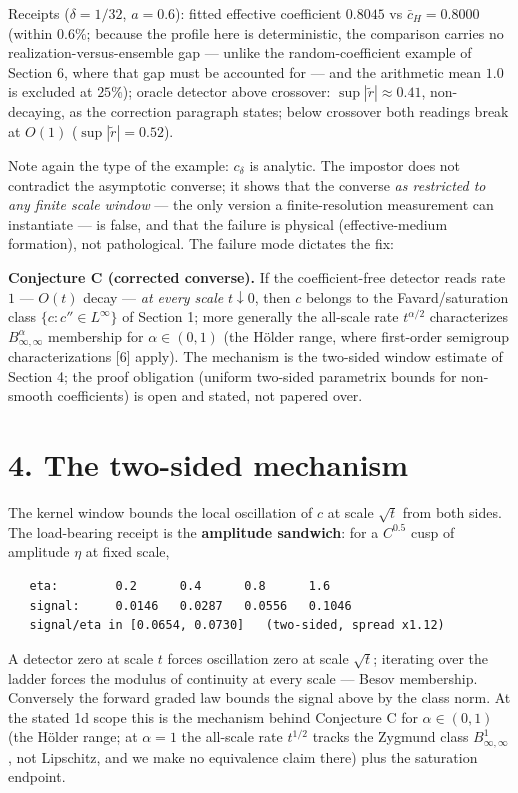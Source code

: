 \documentclass[11pt]{article}
\begin{document}
Receipts ($\delta = 1/32$, $a = 0.6$): fitted effective coefficient $0.8045$ vs $\bar c_H = 0.8000$ (within $0.6\%$; because the profile here is deterministic, the comparison carries no realization-versus-ensemble gap — unlike the random-coefficient example of Section 6, where that gap must be accounted for — and the arithmetic mean $1.0$ is excluded at $25\%$); oracle detector above crossover: $\sup|\tilde r| \approx 0.41$, non-decaying, as the correction paragraph states; below crossover both readings break at $O(1)$ ($\sup|\tilde r| = 0.52$).

Note again the type of the example: $c_\delta$ is analytic.  The impostor does not contradict the asymptotic converse; it shows that the converse \emph{as restricted to any finite scale window} — the only version a finite-resolution measurement can instantiate — is false, and that the failure is physical (effective-medium formation), not pathological.  The failure mode dictates the fix:

\textbf{Conjecture C (corrected converse).}  If the coefficient-free detector reads rate $1$ — $O(t)$ decay — \emph{at every scale} $t \downarrow 0$, then $c$ belongs to the Favard/saturation class $\{c : c'' \in L^\infty\}$ of Section 1; more generally the all-scale rate $t^{\alpha/2}$ characterizes $B^\alpha_{\infty,\infty}$ membership for $\alpha \in (0,1)$ (the Hölder range, where first-order semigroup characterizations [6] apply).  The mechanism is the two-sided window estimate of Section 4; the proof obligation (uniform two-sided parametrix bounds for non-smooth coefficients) is open and stated, not papered over.

\section*{4. The two-sided mechanism}
The kernel window bounds the local oscillation of $c$ at scale $\sqrt t$ from both sides.  The load-bearing receipt is the \textbf{amplitude sandwich}: for a $C^{0.5}$ cusp of amplitude $\eta$ at fixed scale,

\begin{small}\begin{verbatim}
   eta:        0.2      0.4      0.8      1.6
   signal:     0.0146   0.0287   0.0556   0.1046
   signal/eta in [0.0654, 0.0730]   (two-sided, spread x1.12)
\end{verbatim}\end{small}
A detector zero at scale $t$ forces oscillation zero at scale $\sqrt t$; iterating over the ladder forces the modulus of continuity at every scale — Besov membership.  Conversely the forward graded law bounds the signal above by the class norm.  At the stated 1d scope this is the mechanism behind Conjecture C for $\alpha \in (0, 1)$ (the Hölder range; at $\alpha = 1$ the all-scale rate $t^{1/2}$ tracks the Zygmund class $B^1_{\infty,\infty}$, not Lipschitz, and we make no equivalence claim there) plus the saturation endpoint.
\end{document}

